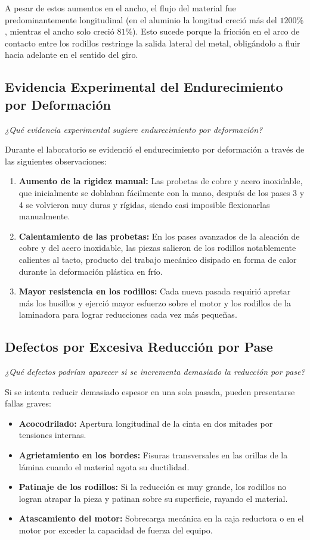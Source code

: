 \documentclass[journal]{IEEEtran}
\begin{document}
A pesar de estos aumentos en el ancho, el flujo del material fue predominantemente longitudinal (en el aluminio la longitud creció más del $1200\%$, mientras el ancho solo creció $81\%$). Esto sucede porque la fricción en el arco de contacto entre los rodillos restringe la salida lateral del metal, obligándolo a fluir hacia adelante en el sentido del giro.

\subsection{Evidencia Experimental del Endurecimiento por Deformación}
\textit{¿Qué evidencia experimental sugiere endurecimiento por deformación?}

Durante el laboratorio se evidenció el endurecimiento por deformación a través de las siguientes observaciones:
\begin{enumerate}
    \item \textbf{Aumento de la rigidez manual:} Las probetas de cobre y acero inoxidable, que inicialmente se doblaban fácilmente con la mano, después de los pases 3 y 4 se volvieron muy duras y rígidas, siendo casi imposible flexionarlas manualmente.
    \item \textbf{Calentamiento de las probetas:} En los pases avanzados de la aleación de cobre y del acero inoxidable, las piezas salieron de los rodillos notablemente calientes al tacto, producto del trabajo mecánico disipado en forma de calor durante la deformación plástica en frío.
    \item \textbf{Mayor resistencia en los rodillos:} Cada nueva pasada requirió apretar más los husillos y ejerció mayor esfuerzo sobre el motor y los rodillos de la laminadora para lograr reducciones cada vez más pequeñas.
\end{enumerate}

\subsection{Defectos por Excesiva Reducción por Pase}
\textit{¿Qué defectos podrían aparecer si se incrementa demasiado la reducción por pase?}

Si se intenta reducir demasiado espesor en una sola pasada, pueden presentarse fallas graves:
\begin{itemize}
    \item \textbf{Acocodrilado:} Apertura longitudinal de la cinta en dos mitades por tensiones internas.
    \item \textbf{Agrietamiento en los bordes:} Fisuras transversales en las orillas de la lámina cuando el material agota su ductilidad.
    \item \textbf{Patinaje de los rodillos:} Si la reducción es muy grande, los rodillos no logran atrapar la pieza y patinan sobre su superficie, rayando el material.
    \item \textbf{Atascamiento del motor:} Sobrecarga mecánica en la caja reductora o en el motor por exceder la capacidad de fuerza del equipo.
\end{itemize}
\end{document}

